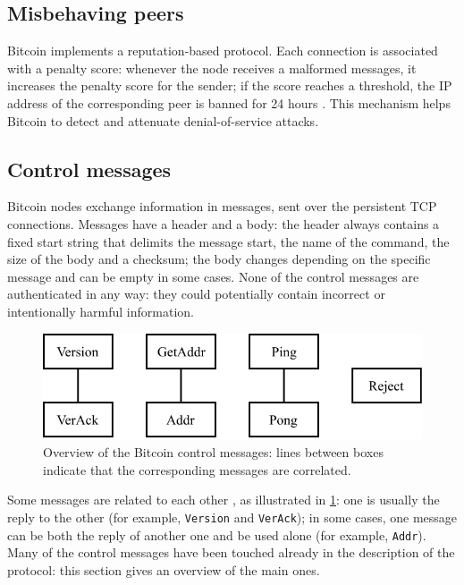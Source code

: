 \subsection{Misbehaving peers}
Bitcoin implements a reputation-based protocol.
Each connection is associated with a penalty score:
whenever the node receives a malformed messages, it increases the penalty score for the sender;
if the score reaches a threshold, the IP address of the corresponding peer is banned for \num{24} hours \cite{deanonymisation_2014}.
This mechanism helps Bitcoin to detect and attenuate denial-of-service attacks.

\subsection{Control messages}
Bitcoin nodes exchange information in messages, sent over the persistent TCP connections.
Messages have a header and a body:
the header always contains a fixed start string that delimits the message start, the name of the command, the size of the body and a checksum;
the body changes depending on the specific message and can be empty in some cases.
None of the control messages are authenticated in any way:
they could potentially contain incorrect or intentionally harmful information.

\begin{figure}[ht]
	\centering
	\vspace*{0.25cm}
	\includegraphics[scale=0.85]{figures/control_messages}
	\vspace*{0.25cm}
	\caption[Overview of the Bitcoin control messages]{
		Overview of the Bitcoin control messages:
		lines between boxes indicate that the corresponding messages are correlated.
	}
	\label{fig:control-messages}
\end{figure}

Some messages are related to each other \cite{bitcoin_reference}, as illustrated in \cref{fig:control-messages}:
one is usually the reply to the other (for example, \texttt{Version} and \texttt{VerAck});
in some cases, one message can be both the reply of another one and be used alone (for example, \texttt{Addr}).
Many of the control messages have been touched already in the description of the protocol:
this section gives an overview of the main ones.


